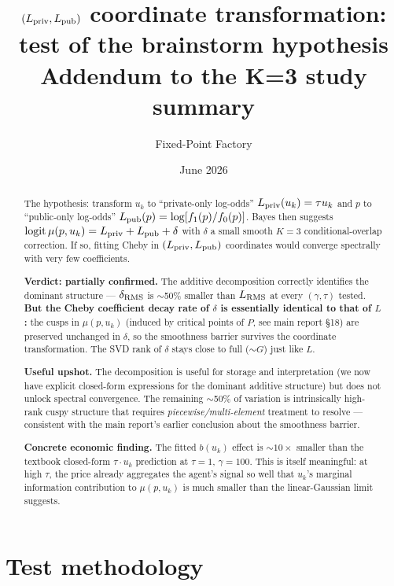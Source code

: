 \documentclass[11pt]{article}
\title{$(L_{\rm priv}, L_{\rm pub})$ coordinate transformation:\\
       test of the brainstorm hypothesis\\
       \large{Addendum to the K=3 study summary}}
\author{Fixed-Point Factory}
\date{June 2026}
\begin{document}
\maketitle

\begin{abstract}
\noindent
The hypothesis: transform $u_k$ to ``private-only log-odds''
$L_{\rm priv}(u_k) = \tau u_k$ and $p$ to ``public-only log-odds''
$L_{\rm pub}(p) = \log[f_1(p)/f_0(p)]$. Bayes then suggests
$\operatorname{logit}\mu(p, u_k) = L_{\rm priv} + L_{\rm pub} + \delta$
with $\delta$ a small smooth $K=3$ conditional-overlap correction.
If so, fitting Cheby in $(L_{\rm priv}, L_{\rm pub})$ coordinates
would converge spectrally with very few coefficients.

\smallskip
\textbf{Verdict: partially confirmed.} The additive decomposition
correctly identifies the dominant structure --- $\delta_{\rm RMS}$ is
$\sim$50\% smaller than $L_{\rm RMS}$ at every $(\gamma, \tau)$ tested.
\textbf{But the Cheby coefficient decay rate of $\delta$ is essentially
identical to that of $L$:} the cusps in $\mu(p, u_k)$ (induced by
critical points of $P$, see main report \S 18) are preserved unchanged
in $\delta$, so the smoothness barrier survives the coordinate
transformation. The SVD rank of $\delta$ stays close to full ($\sim G$)
just like $L$.

\smallskip
\textbf{Useful upshot.} The decomposition is useful for storage and
interpretation (we now have explicit closed-form expressions for the
dominant additive structure) but does not unlock spectral convergence.
The remaining $\sim$50\% of variation is intrinsically high-rank
cuspy structure that requires \emph{piecewise/multi-element} treatment
to resolve --- consistent with the main report's earlier conclusion
about the smoothness barrier.

\smallskip
\textbf{Concrete economic finding.} The fitted $b(u_k)$ effect is
$\sim 10{\times}$ smaller than the textbook closed-form $\tau \cdot u_k$
prediction at $\tau = 1$, $\gamma = 100$. This is itself meaningful:
at high $\tau$, the price already aggregates the agent's signal so
well that $u_k$'s marginal information contribution to $\mu(p, u_k)$
is much smaller than the linear-Gaussian limit suggests.
\end{abstract}

\section{Test methodology}
\end{document}
